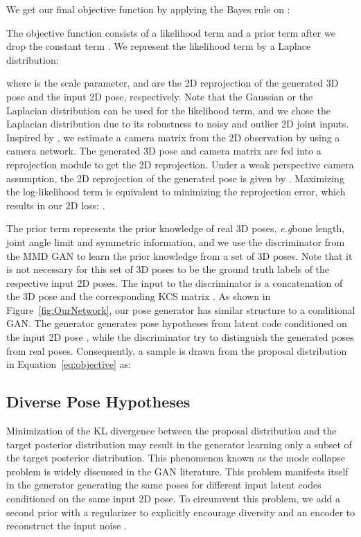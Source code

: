 \documentclass{bmvc2k}
\def\eg{\emph{e.g}\bmvaOneDot}
\begin{document}
We get our final objective function by applying the Bayes rule on :  

The objective function consists of a likelihood term  and a prior  term after we drop the constant term . We represent the likelihood term  by a Laplace distribution:

where  is the scale parameter,  and  are the 2D reprojection of the generated 3D pose and the input 2D pose, respectively. Note that the Gaussian or the Laplacian distribution can be used for the likelihood term, and we chose the Laplacian distribution due to its robustness to noisy and outlier 2D joint inputs. Inspired by \cite{Wandt2019RepNet, habibie2019wild}, we estimate a camera matrix  from the 2D observation by using a camera network. The generated 3D pose  and camera matrix  are fed into a reprojection module to get the 2D reprojection. Under a weak perspective camera assumption, the 2D reprojection of the generated pose  is given by .
Maximizing the log-likelihood term is equivalent to minimizing the reprojection error, which results in our 2D loss: 
.


The prior term  represents the prior knowledge of real 3D poses, \eg bone length, joint angle limit and symmetric information, and we use the discriminator from the MMD GAN \cite{li2017mmd, binkowski2018demystifying} to learn the prior knowledge from a set of 3D poses. Note that it is not necessary for this set of 3D poses to be the ground truth labels of the respective input 2D poses. 
The input to the discriminator is a concatenation of the 3D pose and the corresponding KCS matrix \cite{Wandt2019RepNet}. 
As shown in Figure~\ref{fig:OurNetwork}, our pose generator has similar structure to a conditional GAN. The generator generates pose hypotheses from latent code  conditioned on the input 2D pose , while the discriminator try to distinguish the generated poses from real poses. Consequently, a sample  is drawn from the proposal distribution in Equation~\eqref{eq:objective} as:



\subsection{Diverse Pose Hypotheses}
Minimization of the KL divergence between the proposal distribution and the target posterior distribution may result in the generator learning only a subset of the target posterior distribution.  This phenomenon
known as the mode collapse problem \cite{salimans2016improved,arjovsky2017principled} is widely discussed in the GAN literature. This problem manifests itself in the generator generating the same poses for different input latent codes conditioned on the same input 2D pose. To circumvent this problem, we add a second prior with a regularizer \cite{yang2019diversity} to explicitly encourage diversity and an encoder to reconstruct the input noise \cite{zhu2017toward}.
\end{document}
